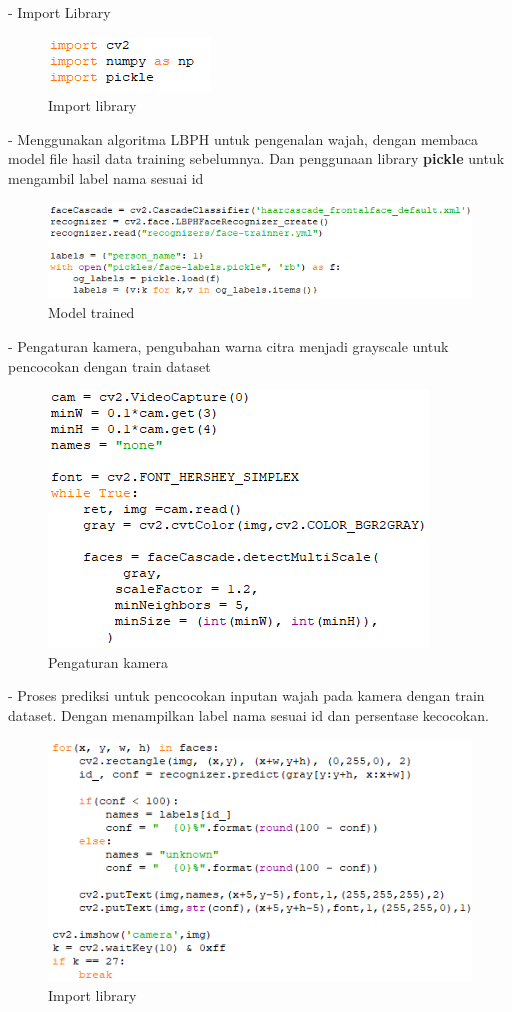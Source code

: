 \begin{enumerate}
    - Import Library
    \begin{figure}[h!]
        \centering
        \includegraphics[width=0.4\linewidth]{images/fr_cam15.PNG}
        \caption{Import library}
    \end{figure}

    - Menggunakan algoritma LBPH untuk pengenalan wajah, dengan membaca model file hasil 
    data training sebelumnya. Dan penggunaan library \textbf{pickle} untuk mengambil label nama sesuai id
    \begin{figure}[h!]
        \centering
        \includegraphics[width=1\linewidth]{images/fr_cam16.PNG}
        \caption{Model trained}
    \end{figure}

    - Pengaturan kamera, pengubahan warna citra menjadi grayscale untuk pencocokan dengan train dataset
    \begin{figure}[h!]
        \centering
        \includegraphics[width=0.65\linewidth]{images/fr_cam17.PNG}
        \caption{Pengaturan kamera}
    \end{figure}
\newpage
    - Proses prediksi untuk pencocokan inputan wajah pada kamera dengan train dataset. 
    Dengan menampilkan label nama sesuai id dan persentase kecocokan.
    \begin{figure}[h!]
        \centering
        \includegraphics[width=0.8\linewidth]{images/fr_cam18.PNG}
        \caption{Import library}
    \end{figure}


\end{enumerate}
